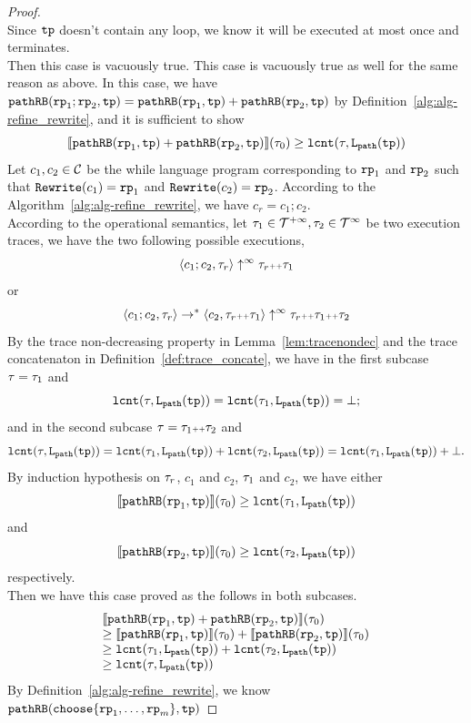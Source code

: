 \begin{proof}
\\
Since $\mathtt{tp}$ doesn't contain any loop, we know it will be executed at most once and terminates.
\\
Then this case is vacuously true.
This case is vacuously true as well for the same reason as above.
In this case, we have $\mathtt{pathRB}(\mathtt{rp}_1;\mathtt{rp}_2, \mathtt{tp}) = \mathtt{pathRB}(\mathtt{rp}_1, \mathtt{tp}) + \mathtt{pathRB}(\mathtt{rp}_2, \mathtt{tp}) $ by Definition~\ref{alg:alg-refine_rewrite}, and
it is sufficient to show
\[
  \llbracket \mathtt{pathRB}(\mathtt{rp}_1, \mathtt{tp}) + \mathtt{pathRB}(\mathtt{rp}_2, \mathtt{tp}) \rrbracket(\mathtt{\tau}_0) \geq \mathtt{lcnt}(\mathtt{\tau}, \mathtt{L}_{\mathtt{path}}(\mathtt{tp})) 
\]
Let $c_1, c_2 \in \mathcal{C}$ be the while language program corresponding to $\mathtt{rp}_1$ and $\mathtt{rp}_2$ such that $\mathtt{Rewrite}(c_1) = \mathtt{rp}_1$ and $\mathtt{Rewrite}(c_2) = \mathtt{rp}_2$.
According to the Algorithm~\ref{alg:alg-refine_rewrite}, we have $c_r = c_1; c_2$.
\\
According to the operational semantics, let $\mathtt{\tau}_1 \in \mathcal{T}^{+\infty}, \mathtt{\tau}_2 \in \mathcal{T}^{\infty}$ be two execution traces, we have the two following possible executions,
\[
  \langle c_1; c_2, \mathtt{\tau}_r \rangle \uparrow^{\infty} \mathtt{\tau}_r {\scriptscriptstyle ++} \mathtt{\tau}_1
\]
or
\[
  \langle c_1; c_2, \mathtt{\tau}_r \rangle \to^* \langle c_2, \mathtt{\tau}_r {\scriptscriptstyle ++} \mathtt{\tau}_1 \rangle \uparrow^{\infty} \mathtt{\tau}_r {\scriptscriptstyle ++} \mathtt{\tau}_1 {\scriptscriptstyle ++} \mathtt{\tau}_2
\]
By the trace non-decreasing property in Lemma~\ref{lem:tracenondec} and the trace concatenaton in Definition~\ref{def:trace_concate}, we have in the first subcase $\mathtt{\tau} = \mathtt{\tau}_1$ and
\[
  \mathtt{lcnt}(\mathtt{\tau}, \mathtt{L}_{\mathtt{path}}(\mathtt{tp}))  = \mathtt{lcnt}(\mathtt{\tau}_1,  \mathtt{L}_{\mathtt{path}}(\mathtt{tp}))  = \bot;
\]
and in the second subcase $\mathtt{\tau} = \mathtt{\tau}_1 {\scriptscriptstyle ++} \mathtt{\tau}_2$ and
\[
  \mathtt{lcnt}(\mathtt{\tau}, \mathtt{L}_{\mathtt{path}}(\mathtt{tp}))  = \mathtt{lcnt}(\mathtt{\tau}_1,  \mathtt{L}_{\mathtt{path}}(\mathtt{tp}))  + \mathtt{lcnt}(\mathtt{\tau}_2,  \mathtt{L}_{\mathtt{path}}(\mathtt{tp})) = \mathtt{lcnt}(\mathtt{\tau}_1,  \mathtt{L}_{\mathtt{path}}(\mathtt{tp})) + \bot.
\]
By induction hypothesis on $\mathtt{\tau}_r$, $c_1$ and $c_2$, $\mathtt{\tau}_1$ and $c_2$, we have
either 
\[
  \llbracket \mathtt{pathRB}(\mathtt{rp}_1, \mathtt{tp}) \rrbracket(\mathtt{\tau}_0)  \geq \mathtt{lcnt}(\mathtt{\tau}_1,  \mathtt{L}_{\mathtt{path}}(\mathtt{tp})) 
\]
and
\[
  \llbracket \mathtt{pathRB}(\mathtt{rp}_2, \mathtt{tp}) \rrbracket(\mathtt{\tau}_0) \geq \mathtt{lcnt}(\mathtt{\tau}_2,  \mathtt{L}_{\mathtt{path}}(\mathtt{tp}))  
\]
respectively.
\\
Then we have this case proved as the follows in both subcases.
\[
  \begin{array}{l}
  \llbracket \mathtt{pathRB}(\mathtt{rp}_1, \mathtt{tp}) + \mathtt{pathRB}(\mathtt{rp}_2, \mathtt{tp}) \rrbracket(\mathtt{\tau}_0)
  \\
  \geq \llbracket \mathtt{pathRB}(\mathtt{rp}_1, \mathtt{tp}) \rrbracket(\mathtt{\tau}_0) + \llbracket \mathtt{pathRB}(\mathtt{rp}_2, \mathtt{tp}) \rrbracket(\mathtt{\tau}_0)
  \\
  \geq \mathtt{lcnt}(\mathtt{\tau}_1,  \mathtt{L}_{\mathtt{path}}(\mathtt{tp}))  + \mathtt{lcnt}(\mathtt{\tau}_2,  \mathtt{L}_{\mathtt{path}}(\mathtt{tp})) 
  \\
  \geq \mathtt{lcnt}(\mathtt{\tau}, \mathtt{L}_{\mathtt{path}}(\mathtt{tp}))
  \end{array}
  \] 
By Definition~\ref{alg:alg-refine_rewrite}, we know 
 $\inoutB(\rpchoose{\rprog_1, \ldots, \rprog_m }, \tpath)$
 

\end{proof}
